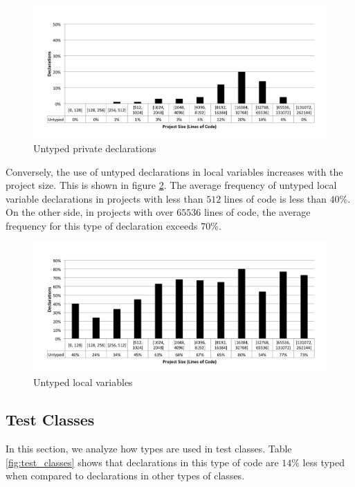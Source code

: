 \documentclass[preprint]{sigplanconf}
\begin{document}
\begin{figure}[ht]
\centering 
\includegraphics[width=1\textwidth]{images/size_proMethodReturn} 
\caption{Untyped private declarations}
\label{fig:size_proMethodReturn} 
\end{figure}

Conversely, the use of untyped declarations in local variables increases with the project size. 
This is shown in figure \ref{fig:size_localVariable}. 
The average frequency of untyped local variable declarations in projects with less than $512$ lines of code is less than $40\%$. 
On the other side, in projects with over $65536$ lines of code, the average frequency for this type of declaration exceeds $70\%$.

\begin{figure}[ht]
\centering 
\includegraphics[width=1\textwidth]{images/size_localVariable} 
\caption{Untyped local variables}
\label{fig:size_localVariable} 
\end{figure}



\subsection{Test Classes\label{sub:scripts}}
In this section, we analyze how types are used in test classes.
Table \ref{fig:test_classes} shows that declarations in this type of code are $14\%$ less typed when compared to declarations in other types of classes.
\end{document}
